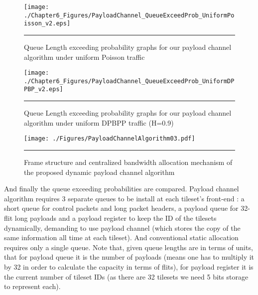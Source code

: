 \begin{figure}[htbp]
  \centering
    \texttt{[image: ./Chapter6\_Figures/PayloadChannel\_QueueExceedProb\_UniformPoisson\_v2.eps]}
    \rule{35em}{0.5pt}
  \caption[Queue Length exceeding probability graphs for our payload channel algorithm under uniform Poisson traffic]{Queue Length exceeding probability graphs for our payload channel algorithm under uniform Poisson traffic}
  \label{fig:Electron}
\end{figure}

\begin{figure}[htbp]
  \centering
    \texttt{[image: ./Chapter6\_Figures/PayloadChannel\_QueueExceedProb\_UniformDPPBP\_v2.eps]}
    \rule{35em}{0.5pt}
  \caption[Queue Length exceeding probability graphs for our payload channel algorithm under uniform DPBPP traffic]{Queue Length exceeding probability graphs for our payload channel algorithm under uniform DPBPP traffic (H=0.9)}
  \label{fig:Electron}
\end{figure}

\begin{figure}[htbp]
  \centering
    \texttt{[image: ./Figures/PayloadChannelAlgorithm03.pdf]}
    \rule{35em}{0.5pt}
  \caption[Frame structure and centralized bandwidth allocation mechanism of the proposed dynamic payload channel algorithm]{Frame structure and centralized bandwidth allocation mechanism of the proposed dynamic payload channel algorithm}
  \label{fig:Electron}
\end{figure}

And finally the queue exceeding probabilities are compared. Payload channel algorithm requires 3 separate queues to be install at each tileset's front-end : a short queue for control packets and long packet headers, a payload queue for 32-flit long payloads and a payload register to keep the ID of the tilesets dynamically, demanding to use payload channel  (which stores the copy of the same information all time at each tileset). And conventional static allocation requires only a single queue. Note that, given queue lengths are in terms of units, that for payload queue it is the number of payloads (means one has to multiply it by 32 in order to calculate the capacity in terms of flits), for payload register it is the current number of tileset IDs (as there are 32 tilesets we need 5 bits storage to represent each). 

